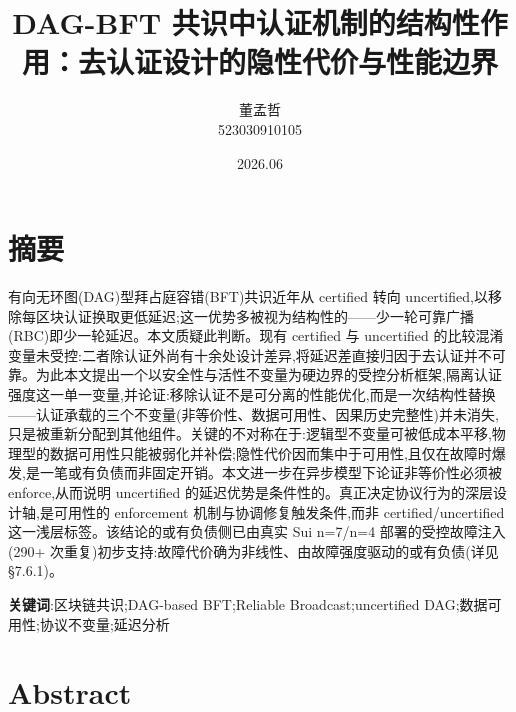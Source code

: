 \documentclass[UTF8,fontset=windows,a4paper,11pt]{ctexart}
\title{DAG-BFT
共识中认证机制的结构性作用：去认证设计的隐性代价与性能边界}
\author{董孟哲\\523030910105}
\date{2026.06}
\begin{document}
\maketitle
\tableofcontents
\bigskip

\section{摘要}\label{ux6458ux8981}

有向无环图(DAG)型拜占庭容错(BFT)共识近年从 certified 转向
uncertified,以移除每区块认证换取更低延迟;这一优势多被视为结构性的------少一轮可靠广播(RBC)即少一轮延迟。本文质疑此判断。现有
certified 与 uncertified
的比较混淆变量未受控:二者除认证外尚有十余处设计差异,将延迟差直接归因于去认证并不可靠。为此本文提出一个以安全性与活性不变量为硬边界的受控分析框架,隔离认证强度这一单一变量,并论证:移除认证不是可分离的性能优化,而是一次结构性替换------认证承载的三个不变量(非等价性、数据可用性、因果历史完整性)并未消失,只是被重新分配到其他组件。关键的不对称在于:逻辑型不变量可被低成本平移,物理型的数据可用性只能被弱化并补偿;隐性代价因而集中于可用性,且仅在故障时爆发,是一笔或有负债而非固定开销。本文进一步在异步模型下论证非等价性必须被
enforce,从而说明 uncertified
的延迟优势是条件性的。真正决定协议行为的深层设计轴,是可用性的
enforcement 机制与协调修复触发条件,而非 certified/uncertified
这一浅层标签。该结论的或有负债侧已由真实 Sui n=7/n=4
部署的受控故障注入(290+
次重复)初步支持:故障代价确为非线性、由故障强度驱动的或有负债(详见
§7.6.1)。

\textbf{关键词}:区块链共识;DAG-based BFT;Reliable Broadcast;uncertified
DAG;数据可用性;协议不变量;延迟分析

\section{Abstract}\label{abstract}
\end{document}
